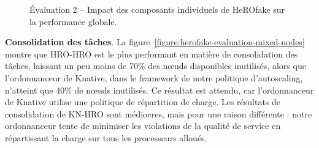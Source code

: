 \begin{figure}[!ht]
    \centering
    \qquad
    \qquad
    \caption{Évaluation 2 -- Impact des composants individuels de HeROfake sur la performance globale.}
    \label{figure:herofake-evaluation-hro-mixed}
\end{figure}

\textbf{Consolidation des tâches}. La figure~\ref{figure:herofake-evaluation-mixed-nodes} montre que HRO-HRO est le plus performant en matière de consolidation des tâches, laissant un peu moins de 70\% des nœuds disponibles inutilisés, alors que l'ordonnanceur de Knative, dans le framework de notre politique d'autoscaling, n'atteint que 40\% de nœuds inutilisés. Ce résultat est attendu, car l'ordonnanceur de Knative utilise une politique de répartition de charge. Les résultats de consolidation de KN-HRO sont médiocres, mais pour une raison différente : notre ordonnanceur tente de minimiser les violations de la qualité de service en répartissant la charge sur tous les processeurs alloués.

